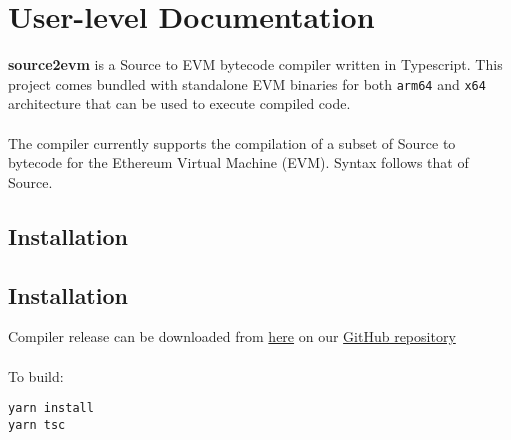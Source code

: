 \tableofcontents
\setcounter{secnumdepth}{3}
\newpage


\label{Chapter1} %


\newcommand{\keyword}[1]{\textbf{#1}}
\newcommand{\tabhead}[1]{\textbf{#1}}
\newcommand{\code}[1]{\texttt{#1}}
\newcommand{\file}[1]{\texttt{\bfseries#1}}
\newcommand{\option}[1]{\texttt{\itshape#1}}


\section{User-level Documentation}
\textbf{source2evm} is a Source to EVM bytecode compiler written in Typescript. This project comes bundled with standalone EVM binaries for both \code{arm64} and \code{x64} architecture that can be used to execute compiled code.\\\\
The compiler currently supports the compilation of a subset of Source to bytecode for the Ethereum Virtual Machine (EVM). Syntax follows that of Source. 

\subsection{Installation}
\subsection{Installation}
Compiler release can be downloaded from \href{https://github.com/chence08/source2evm/releases/download/v1.0/source2evm_v1.zip}{here} on our \href{https://github.com/chence08/source2evm}{GitHub repository}\\\\
To build: 
\begin{verbatim}
yarn install
yarn tsc
\end{verbatim}

